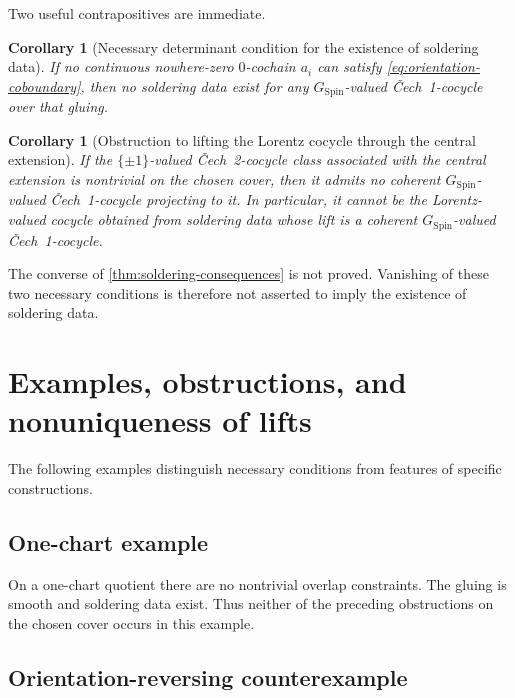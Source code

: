 \documentclass[11pt,a4paper]{article}
\newtheorem{corollary}[theorem]{Corollary}
\theoremstyle{definition}
\theoremstyle{remark}
\newcommand{\SpinG}{G_{\mathrm{Spin}}}
\newcommand{\Cech}{\ifmmode\text{\v{C}ech}\else\v{C}ech\fi}
\begin{document}
Two useful contrapositives are immediate.

\begin{corollary}[Necessary determinant condition for the existence of soldering data]
\label{cor:orientation-obstruction}
If no continuous nowhere-zero \(0\)-cochain \(a_i\) can satisfy
\eqref{eq:orientation-coboundary}, then no soldering data exist for any \(\SpinG\)-valued \Cech\ 1-cocycle over that gluing.
\end{corollary}

\begin{corollary}[Obstruction to lifting the Lorentz cocycle through the central extension]
\label{cor:spin-obstruction}
If the \(\{\pm1\}\)-valued \Cech\ 2-cocycle class associated with the central extension is nontrivial on the chosen cover,
then it admits no coherent \(\SpinG\)-valued \Cech\ 1-cocycle projecting to
it.  In particular, it cannot be the Lorentz-valued cocycle obtained from soldering data whose lift is a coherent \(\SpinG\)-valued \Cech\ 1-cocycle.
\end{corollary}

The converse of \cref{thm:soldering-consequences} is not proved.  Vanishing of these two necessary conditions is therefore not asserted to imply the existence of soldering data.

\clearpage
\section{Examples, obstructions, and nonuniqueness of lifts}
\label{sec:examples}

The following examples distinguish necessary conditions from features of
specific constructions.

\subsection{One-chart example}

On a one-chart quotient there are no nontrivial overlap constraints.  The gluing is smooth and soldering data exist.  Thus neither of the preceding obstructions on the chosen cover occurs in this example.

\subsection{Orientation-reversing counterexample}
\end{document}

